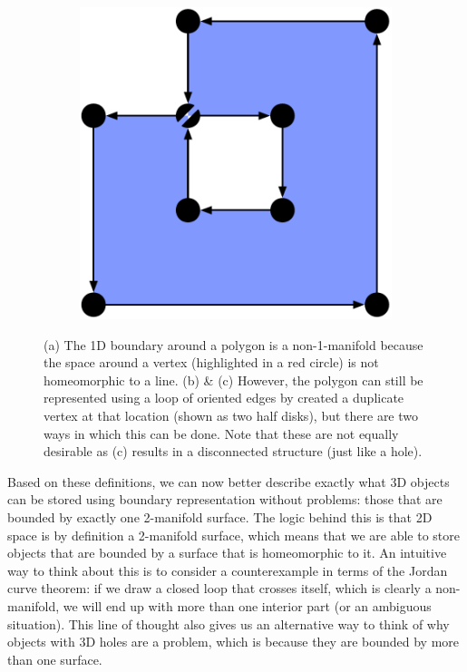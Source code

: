 \begin{figure}
\begin{subfigure}[b]{0.3\linewidth}
\caption{}%
\label{subfig:nonmanifold-1}
\end{subfigure}
\quad
\begin{subfigure}[b]{0.3\linewidth}
\includegraphics[width=\linewidth]{figs/nonmanifold-2}
\caption{}%
\label{subfig:nonmanifold-2}
\end{subfigure}
\caption{(a) The 1D boundary around a polygon is a non-1-manifold because the space around a vertex (highlighted in a red circle) is not homeomorphic to a line. (b) \& (c) However, the polygon can still be represented using a loop of oriented edges by created a duplicate vertex at that location (shown as two half disks), but there are two ways in which this can be done.
Note that these are not equally desirable as (c) results in a disconnected structure (just like a hole).}%
\label{fig:nonmanifold}
\end{figure}

Based on these definitions, we can now better describe exactly what 3D objects can be stored using boundary representation without problems: those that are bounded by exactly one 2-manifold surface.
The logic behind this is that 2D space is by definition a 2-manifold surface, which means that we are able to store objects that are bounded by a surface that is homeomorphic to it.
An intuitive way to think about this is to consider a counterexample in terms of the Jordan curve theorem: if we draw a closed loop that crosses itself, which is clearly a non-manifold, we will end up with more than one interior part (or an ambiguous situation).
This line of thought also gives us an alternative way to think of why objects with 3D holes are a problem, which is because they are bounded by more than one surface.

